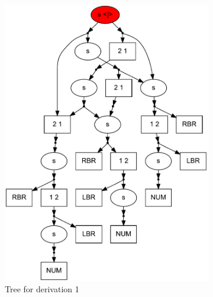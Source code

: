 \documentclass{sig-alternate} %
\begin{document}
\begin{figure}[ht]
\begin{center}
\begin{subfigure}[b]{0.3\textwidth}
        \includegraphics[width=\textwidth]{dot/Brackets.pdf}
        \caption{Tree for derivation 1}
        \label{tree1}        
    \end{subfigure}
    ~
    \begin{subfigure}[b]{0.3\textwidth}

\end{subfigure}
\end{center}
\end{figure}
\end{document}
